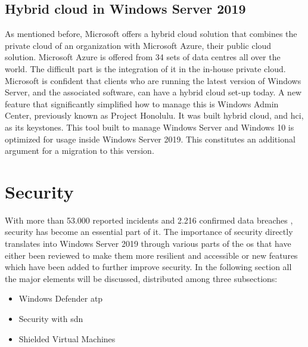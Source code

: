 \subsection{Hybrid cloud in Windows Server 2019}
\label{hybrid-cloud-windows-server-2019}
As mentioned before, Microsoft offers a hybrid cloud solution that combines the private cloud of an organization with Microsoft Azure, their public cloud solution. Microsoft Azure is offered from 34 sets of data centres all over the world. The difficult part is the integration of it in the in-house private cloud. Microsoft is confident that clients who are running the latest version of Windows Server, and the associated software, can have a hybrid cloud set-up today. A new feature that significantly simplified how to manage this is Windows Admin Center, previously known as Project Honolulu. It was built hybrid cloud, and \acrfull{hci}, as its keystones. This tool built to manage Windows Server and Windows 10 is optimized for usage inside Windows Server 2019. This constitutes an additional argument for a migration to this version.

\section{Security}
With more than 53.000 reported incidents and 2.216 confirmed data breaches \autocite{Verizon2018}, security has become an essential part of \acrshort{it}. The importance of security directly translates into Windows Server 2019 through various parts of the \acrshort{os} that have either been reviewed to make them more resilient and accessible or new features which have been added to further improve security. In the following section all the major elements will be discussed, distributed among three subsections:
\begin{itemize}
	\item Windows Defender \acrfull{atp}
	\item Security with \acrfull{sdn}
	\item Shielded Virtual Machines
\end{itemize}

